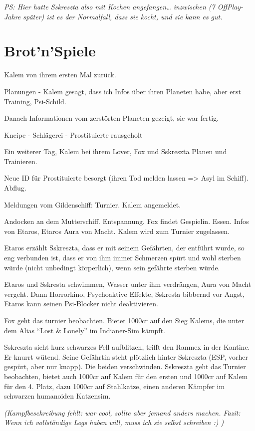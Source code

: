 \documentclass[11pt]{scrartcl}
\begin{document}
\emph{PS: Hier hatte Sskreszta also mit Kochen angefangen\ldots{}
inzwischen (7 OffPlay-Jahre später) ist es der Normalfall, dass sie
kocht, und sie kann es gut.}

\section{Brot'n'Spiele}

Kalem von ihrem ersten Mal zurück.

Planungen - Kalem gesagt, dass ich Infos über ihren Planeten habe, aber
erst Training, Psi-Schild.

Danach Informationen vom zerstörten Planeten gezeigt, sie war fertig.

Kneipe - Schlägerei - Prostituierte rausgeholt

Ein weiterer Tag, Kalem bei ihrem Lover, Fox und Sskreszta Planen und
Trainieren.

Neue ID für Prostituierte besorgt (ihren Tod melden lassen
=\textgreater{} Asyl im Schiff). Abflug.

Meldungen vom Gildenschiff: Turnier. Kalem angemeldet.

Andocken an dem Mutterschiff. Entspannung. Fox findet Gespielin. Essen.
Infos von Etaros, Etaros Aura von Macht. Kalem wird zum Turnier
zugelassen.

Etaros erzählt Sskreszta, dass er mit seinem Gefährten, der entführt
wurde, so eng verbunden ist, dass er von ihm immer Schmerzen spürt und
wohl sterben würde (nicht unbedingt körperlich), wenn sein gefährte
sterben würde.

Etaros und Sskresta schwimmen, Wasser unter ihm verdrängen, Aura von
Macht vergeht. Dann Horrorkino, Psychoaktive Effekte, Sskresta bibbernd
vor Angst, Etaros kann seinen Psi-Blocker nicht deaktivieren.

Fox geht das turnier beobachten. Bietet 1000cr auf den Sieg Kalems, die
unter dem Alias ``Lost \& Lonely'' im Indianer-Sim kämpft.

Sskreszta sieht kurz schwarzes Fell aufblitzen, trifft den Ranmex in der
Kantine. Er knurrt wütend. Seine Gefährtin steht plötzlich hinter
Sskreszta (ESP, vorher gespürt, aber nur knapp). Die beiden
verschwinden. Sskreszta geht das Turnier beobachten, bietet auch 1000cr
auf Kalem für den ersten und 1000cr auf Kalem für den 4. Platz, dazu
1000cr auf Stahlkatze, einen anderen Kämpfer im schwarzen humanoiden
Katzensim.

\emph{(Kampfbeschreibung fehlt: war cool, sollte aber jemand anders
machen. Fazit: Wenn ich vollständige Logs haben will, muss ich sie
selbst schreiben :) )}
\end{document}
